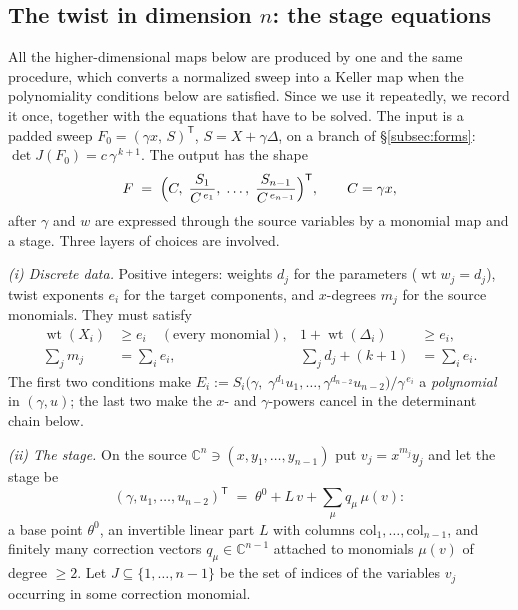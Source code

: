 \documentclass[11pt]{article}
\numberwithin{equation}{section}
\theoremstyle{plain}
\theoremstyle{definition}
\theoremstyle{remark}
\newcommand{\C}{\mathbb{C}}
\begin{document}
\subsection{The twist in dimension \texorpdfstring{$n$}{n}: the stage equations}\label{subsec:stage}

All the higher-dimensional maps below are produced by one and the same
procedure, which converts a normalized sweep into a Keller map when the
polynomiality conditions below are satisfied. Since we use
it repeatedly, we record it once, together with the equations that have to be
solved. The input is a padded sweep $F_0=(\gamma x,\,S)^{\mathsf T}$,
$S=X+\gamma\Delta$, on a branch of \S\ref{subsec:forms}:
$\det J(F_0)=c\,\gamma^{\,k+1}$. The output has the shape
\[
F\;=\;\Bigl(C,\;\frac{S_1}{C^{\,e_1}},\;\dots,\;
\frac{S_{n-1}}{C^{\,e_{n-1}}}\Bigr)^{\mathsf T},
\qquad C=\gamma x ,
\]
after $\gamma$ and $w$ are expressed through the source variables by a
monomial map and a stage. Three layers of choices are involved.

\emph{(i) Discrete data.} Positive integers: weights $d_j$ for the parameters
($\operatorname{wt}w_j=d_j$), twist exponents $e_i$ for the target components,
and $x$-degrees $m_j$ for the source monomials. They must satisfy
\begin{equation}\label{eq:discrete}
\begin{aligned}
 \operatorname{wt}(X_i)&\ge e_i\quad(\text{every monomial}),&
 1+\operatorname{wt}(\Delta_i)&\ge e_i,\\
 \sum_j m_j&=\sum_i e_i,&
 \sum_j d_j+(k+1)&=\sum_i e_i.
\end{aligned}
\end{equation}
The first two conditions make
$E_i:=S_i\bigl(\gamma,\;\gamma^{d_1}u_1,\dots,\gamma^{d_{n-2}}u_{n-2}\bigr)
/\gamma^{\,e_i}$ a \emph{polynomial} in $(\gamma,u)$; the last two make the
$x$- and $\gamma$-powers cancel in the determinant chain below.

\emph{(ii) The stage.} On the source $\C^n\ni(x,y_1,\dots,y_{n-1})$ put
$v_j=x^{m_j}y_j$ and let the stage be
\[
(\gamma,u_1,\dots,u_{n-2})^{\mathsf T}
\;=\;\theta^0+L\,v+\textstyle\sum_\mu q_\mu\,\mu(v):
\]
a base point $\theta^0$, an invertible linear part $L$ with columns
$\mathrm{col}_1,\dots,\mathrm{col}_{n-1}$, and finitely many correction
vectors $q_\mu\in\C^{n-1}$ attached to monomials $\mu(v)$ of degree $\ge2$.
Let $J\subseteq\{1,\dots,n-1\}$ be the set of indices of the variables $v_j$
occurring in some correction monomial.
\end{document}
